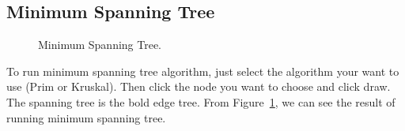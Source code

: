 \documentclass{article}
\begin{document}
\subsection{Minimum Spanning Tree}
\begin{figure}[htb]
\centering
{}
   \caption{Minimum Spanning Tree.}
   \label{fig:minimum spanning tree}
\end{figure}
To run minimum spanning tree algorithm, just select the algorithm your want to use (Prim or Kruskal). Then click the node you want to choose and click draw. The spanning tree is the bold edge tree. From Figure~\ref{fig:minimum spanning tree}, we can see the result of running minimum spanning tree.\\
\end{document}
